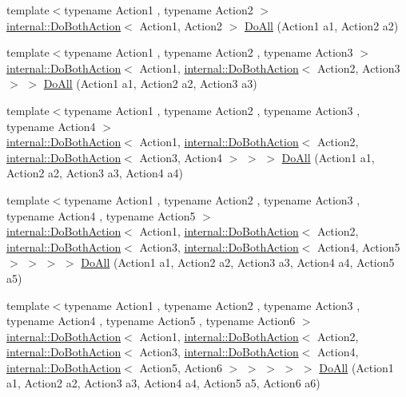 \begin{DoxyCompactItemize}
\item 
{\footnotesize template$<$typename Action1 , typename Action2 $>$ }\\\hyperlink{classtesting_1_1internal_1_1DoBothAction}{internal\+::\+Do\+Both\+Action}$<$ Action1, Action2 $>$ \hyperlink{namespacetesting_a5f533932753d2af95000e96c4a3042e3}{Do\+All} (Action1 a1, Action2 a2)
\item 
{\footnotesize template$<$typename Action1 , typename Action2 , typename Action3 $>$ }\\\hyperlink{classtesting_1_1internal_1_1DoBothAction}{internal\+::\+Do\+Both\+Action}$<$ Action1, \hyperlink{classtesting_1_1internal_1_1DoBothAction}{internal\+::\+Do\+Both\+Action}$<$ Action2, Action3 $>$ $>$ \hyperlink{namespacetesting_ad6a3ce5e229120ea287286a86394d712}{Do\+All} (Action1 a1, Action2 a2, Action3 a3)
\item 
{\footnotesize template$<$typename Action1 , typename Action2 , typename Action3 , typename Action4 $>$ }\\\hyperlink{classtesting_1_1internal_1_1DoBothAction}{internal\+::\+Do\+Both\+Action}$<$ Action1, \hyperlink{classtesting_1_1internal_1_1DoBothAction}{internal\+::\+Do\+Both\+Action}$<$ Action2, \hyperlink{classtesting_1_1internal_1_1DoBothAction}{internal\+::\+Do\+Both\+Action}$<$ Action3, Action4 $>$ $>$ $>$ \hyperlink{namespacetesting_a790ce08c80a1f8ececa0f2a4f678247c}{Do\+All} (Action1 a1, Action2 a2, Action3 a3, Action4 a4)
\item 
{\footnotesize template$<$typename Action1 , typename Action2 , typename Action3 , typename Action4 , typename Action5 $>$ }\\\hyperlink{classtesting_1_1internal_1_1DoBothAction}{internal\+::\+Do\+Both\+Action}$<$ Action1, \hyperlink{classtesting_1_1internal_1_1DoBothAction}{internal\+::\+Do\+Both\+Action}$<$ Action2, \hyperlink{classtesting_1_1internal_1_1DoBothAction}{internal\+::\+Do\+Both\+Action}$<$ Action3, \hyperlink{classtesting_1_1internal_1_1DoBothAction}{internal\+::\+Do\+Both\+Action}$<$ Action4, Action5 $>$ $>$ $>$ $>$ \hyperlink{namespacetesting_a794c41d43373d7af9cebbc7f1c5e4a57}{Do\+All} (Action1 a1, Action2 a2, Action3 a3, Action4 a4, Action5 a5)
\item 
{\footnotesize template$<$typename Action1 , typename Action2 , typename Action3 , typename Action4 , typename Action5 , typename Action6 $>$ }\\\hyperlink{classtesting_1_1internal_1_1DoBothAction}{internal\+::\+Do\+Both\+Action}$<$ Action1, \hyperlink{classtesting_1_1internal_1_1DoBothAction}{internal\+::\+Do\+Both\+Action}$<$ Action2, \hyperlink{classtesting_1_1internal_1_1DoBothAction}{internal\+::\+Do\+Both\+Action}$<$ Action3, \hyperlink{classtesting_1_1internal_1_1DoBothAction}{internal\+::\+Do\+Both\+Action}$<$ Action4, \hyperlink{classtesting_1_1internal_1_1DoBothAction}{internal\+::\+Do\+Both\+Action}$<$ Action5, Action6 $>$ $>$ $>$ $>$ $>$ \hyperlink{namespacetesting_aa6c87c8d7520fb333f1559487d3e06e9}{Do\+All} (Action1 a1, Action2 a2, Action3 a3, Action4 a4, Action5 a5, Action6 a6)

\end{DoxyCompactItemize}
